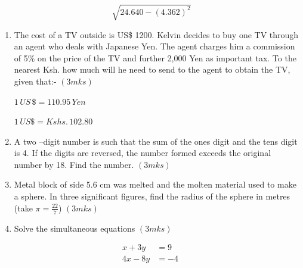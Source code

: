 \documentclass[
  a4paperpaper,
]{scrbook}
\begin{document}
\begin{tcolorbox}
\[\sqrt[]{24.640-(4.362)^2} \]

\begin{enumerate}
\def\labelenumi{\arabic{enumi}.}
\setcounter{enumi}{5}
\item
  The cost of a TV outside is US\$ 1200. Kelvin decides to buy one TV
  through an agent who deals with Japanese Yen. The agent charges him a
  commission of 5\% on the price of the TV and further 2,000 Yen as
  important tax. To the nearest Ksh. how much will he need to send to
  the agent to obtain the TV, given that:- \((3mks)\)

  \(1\,US\, \$ = 110.95 \,Yen\)

  \(1\,US \$ = Kshs. \,102.80\)
\item
  A two --digit number is such that the sum of the ones digit and the
  tens digit is 4. If the digits are reversed, the number formed exceeds
  the original number by 18. Find the number. \((3mks)\)
\item
  Metal block of side 5.6 cm was melted and the molten material used to
  make a sphere. In three significant figures, find the radius of the
  sphere in metres (take \(\pi =\frac{22}{7}\)) \((3mks)\)
\item
  Solve the simultaneous equations \((3mks)\)
\end{enumerate}

    \begin{align*}
     x+3y&=9\\
     4x-8y&=-4
    \end{align*}


\end{tcolorbox}
\end{document}
